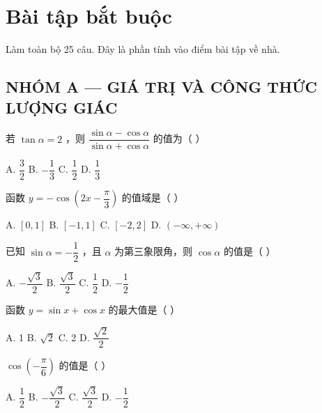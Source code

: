 \documentclass[11pt, a4paper]{article}
\begin{document}

\section{Bài tập bắt buộc}

Làm toàn bộ 25 câu. Đây là phần tính vào điểm bài tập về nhà.

\subsection*{NHÓM A — GIÁ TRỊ VÀ CÔNG THỨC LƯỢNG GIÁC}

\begin{baitap}[1]
若 $\tan\alpha = 2$ ，则 $\dfrac{\sin\alpha - \cos\alpha}{\sin\alpha + \cos\alpha}$ 的值为（ ）
\par\vspace{3pt}
\noindent A. $\dfrac{3}{2}$ \quad B. $-\dfrac{1}{3}$ \quad C. $\dfrac{1}{2}$ \quad D. $\dfrac{1}{3}$
\end{baitap}

\begin{baitap}[2]
函数 $y = -\cos\!\left(2x - \dfrac{\pi}{3}\right)$ 的值域是（ ）
\par\vspace{3pt}
\noindent A. $[0,1]$ \quad B. $[-1,1]$ \quad C. $[-2,2]$ \quad D. $(-\infty, +\infty)$
\end{baitap}

\begin{baitap}[3]
已知 $\sin\alpha = -\dfrac{1}{2}$ ，且 $\alpha$ 为第三象限角，则 $\cos\alpha$ 的值是（ ）
\par\vspace{3pt}
\noindent A. $-\dfrac{\sqrt{3}}{2}$ \quad B. $\dfrac{\sqrt{3}}{2}$ \quad C. $\dfrac{1}{2}$ \quad D. $-\dfrac{1}{2}$
\end{baitap}

\begin{baitap}[4]
函数 $y = \sin x + \cos x$ 的最大值是（ ）
\par\vspace{3pt}
\noindent A. 1 \quad B. $\sqrt{2}$ \quad C. 2 \quad D. $\dfrac{\sqrt{2}}{2}$
\end{baitap}

\begin{baitap}[5]
$\cos\!\left(-\dfrac{\pi}{6}\right)$ 的值是（ ）
\par\vspace{3pt}
\noindent A. $\dfrac{1}{2}$ \quad B. $-\dfrac{\sqrt{3}}{2}$ \quad C. $\dfrac{\sqrt{3}}{2}$ \quad D. $-\dfrac{1}{2}$
\end{baitap}
\end{document}
